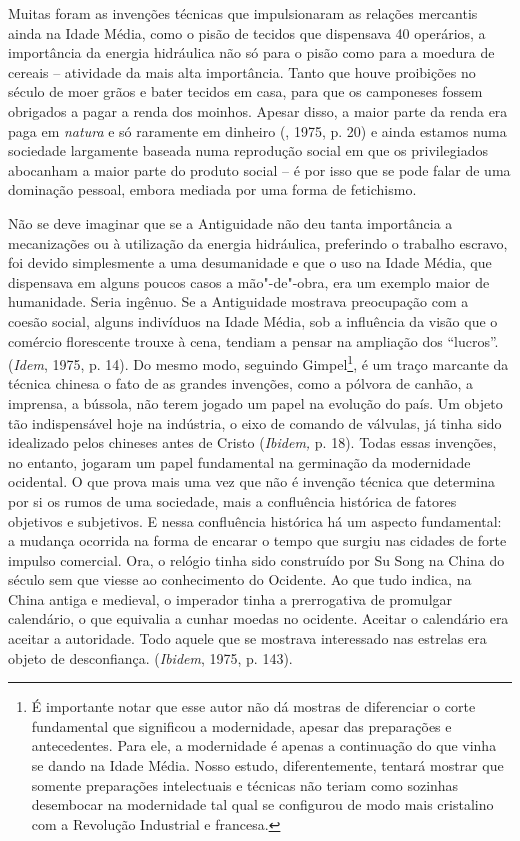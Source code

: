 Muitas foram as invenções técnicas que impulsionaram as relações
mercantis ainda na Idade Média, como o pisão de tecidos que dispensava
40 operários, a importância da energia hidráulica não só para o pisão
como para a moedura de cereais -- atividade da mais alta importância.
Tanto que houve proibições no século  de moer grãos e bater tecidos
em casa, para que os camponeses fossem obrigados a pagar a renda dos
moinhos. Apesar disso, a maior parte da renda era paga em \emph{natura}
e só raramente em dinheiro (, 1975, p. 20) e ainda estamos numa
sociedade largamente baseada numa reprodução social em que os
privilegiados abocanham a maior parte do produto social -- é por isso
que se pode falar de uma dominação pessoal, embora mediada por uma forma
de fetichismo.

Não se deve imaginar que se a Antiguidade não deu tanta importância a
mecanizações ou à utilização da energia hidráulica, preferindo o
trabalho escravo, foi devido simplesmente a uma desumanidade e que o uso
na Idade Média, que dispensava em alguns poucos casos a mão"-de"-obra, era
um exemplo maior de humanidade. Seria ingênuo. Se a Antiguidade mostrava
preocupação com a coesão social, alguns indivíduos na Idade Média, sob a
influência da visão que o comércio florescente trouxe à cena, tendiam a
pensar na ampliação dos ``lucros''. (\emph{Idem}, 1975, p. 14). Do mesmo
modo, seguindo Gimpel\footnote{É importante notar que esse autor não dá
  mostras de diferenciar o corte fundamental que significou a
  modernidade, apesar das preparações e antecedentes. Para ele, a
  modernidade é apenas a continuação do que vinha se dando na Idade
  Média. Nosso estudo, diferentemente, tentará mostrar que somente
  preparações intelectuais e técnicas não teriam como sozinhas
  desembocar na modernidade tal qual se configurou de modo mais
  cristalino com a Revolução Industrial e francesa.}, é um traço
marcante da técnica chinesa o fato de as grandes invenções, como a
pólvora de canhão, a imprensa, a bússola, não terem jogado um papel na
evolução do país. Um objeto tão indispensável hoje na indústria, o eixo
de comando de válvulas, já tinha sido idealizado pelos chineses antes de
Cristo (\emph{Ibidem,} p. 18). Todas essas invenções, no entanto,
jogaram um papel fundamental na germinação da modernidade ocidental. O
que prova mais uma vez que não é invenção técnica que determina por si
os rumos de uma sociedade, mais a confluência histórica de fatores
objetivos e subjetivos. E nessa confluência histórica há um aspecto
fundamental: a mudança ocorrida na forma de encarar o tempo que surgiu
nas cidades de forte impulso comercial. Ora, o relógio tinha sido
construído por Su Song na China do século  sem que viesse ao
conhecimento do Ocidente. Ao que tudo indica, na China antiga e
medieval, o imperador tinha a prerrogativa de promulgar calendário, o
que equivalia a cunhar moedas no ocidente. Aceitar o calendário era
aceitar a autoridade. Todo aquele que se mostrava interessado nas
estrelas era objeto de desconfiança. (\emph{Ibidem}, 1975, p. 143).

